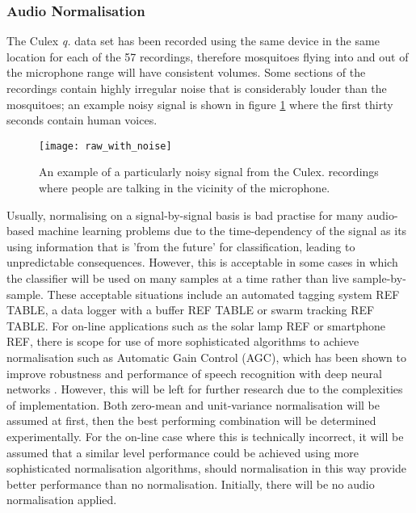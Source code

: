         \subsubsection{Audio Normalisation}
        \label{subsubsec:exp-clf-ass-aud}
            The Culex \textit{q.} data set has been recorded using the same device in the same location for each of the 57 recordings, therefore mosquitoes flying into and out of the microphone range will have consistent volumes. Some sections of the recordings contain highly irregular noise that is considerably louder than the mosquitoes; an example noisy signal is shown in figure \ref{fig:exp-clf-audio-noisy} where the first thirty seconds contain human voices.
            \begin{figure}[ht]
                \centering
                \texttt{[image: raw\_with\_noise]}
                \caption{An example of a particularly noisy signal from the Culex. recordings where people are talking in the vicinity of the microphone.}
                \label{fig:exp-clf-audio-noisy}
            \end{figure}
            Usually, normalising on a signal-by-signal basis is bad practise for many audio-based machine learning problems due to the time-dependency of the signal as its using information that is 'from the future' for classification, leading to unpredictable consequences. However, this is acceptable in some cases in which the classifier will be used on many samples at a time rather than live sample-by-sample. These acceptable situations include an automated tagging system REF TABLE, a data logger with a buffer REF TABLE or swarm tracking REF TABLE. 
            For on-line applications such as the solar lamp REF or smartphone REF, there is scope for use of more sophisticated algorithms to achieve normalisation such as Automatic Gain Control (AGC), which has been shown to improve robustness and performance of speech recognition with deep neural networks \cite{Prabhavalkar2015}. However, this will be left for further research due to the complexities of implementation. Both zero-mean and unit-variance normalisation will be assumed at first, then the best performing combination will be determined experimentally. For the on-line case where this is technically incorrect, it will be assumed that a similar level performance could be achieved using more sophisticated normalisation algorithms, should normalisation in this way provide better performance than no normalisation. Initially, there will be no audio normalisation applied.


